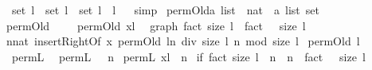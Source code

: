 \begin{isabellebody}
\ {\isachardoublequoteopen}set\ l{}\ {\isasymunion}\ set\ l{}\ {\isacharequal}\ set\ {\isacharparenleft}l{}\ {\isacharat}\ l{}{\isacharparenright}{\isachardoublequoteclose}%
\isadelimproof
\ %
\endisadelimproof
%
\isatagproof
{}\isamarkupfalse%
\ simp%
\endisatagproof
{\isafoldproof}%
%
\isadelimproof
%
\endisadelimproof
\isanewline
\isanewline
{}\isamarkupfalse%
\ permOld{\isacharcolon}{\isacharcolon}{\isachardoublequoteopen}{\isacharprime}a\ list\ {\isacharequal}{\isachargreater}\ {\isacharparenleft}nat\ {\isasymtimes}\ {\isacharparenleft}{\isacharprime}a\ list{\isacharparenright}{\isacharparenright}\ set{\isachardoublequoteclose}\ \ \isanewline
{\isachardoublequoteopen}permOld\ {\isacharbrackleft}{\isacharbrackright}\ {\isacharequal}\ {\isacharbraceleft}{\isacharbraceright}{\isachardoublequoteclose}\ {\isacharbar}\ {\isachardoublequoteopen}permOld\ {\isacharparenleft}x{\isacharhash}l{\isacharparenright}\ {\isacharequal}\ \isanewline
graph\ {\isacharbraceleft}fact\ {\isacharparenleft}size\ l{\isacharparenright}\ {\isachardot}{\isachardot}{\isacharless}\ {}{\isacharplus}fact\ {\isacharparenleft}{}\ {\isacharplus}\ {\isacharparenleft}size\ l{\isacharparenright}{\isacharparenright}{\isacharbraceright}\isanewline
{\isacharparenleft}{\isacharpercent}n{\isacharcolon}{\isacharcolon}nat{\isachardot}\ insertRightOf\ x\ {\isacharparenleft}permOld\ l{\isacharcomma}{\isacharcomma}{\isacharparenleft}n\ div\ size\ l{\isacharparenright}{\isacharparenright}\ {\isacharparenleft}n\ mod\ {\isacharparenleft}size\ l{\isacharparenright}{\isacharparenright}{\isacharparenright}\isanewline
{\isacharplus}{\isacharasterisk}\ {\isacharparenleft}permOld\ l{\isacharparenright}{\isachardoublequoteclose}\isanewline
\isanewline
{}\isamarkupfalse%
\ permL\ \ \isanewline
{\isachardoublequoteopen}permL\ {\isacharbrackleft}{\isacharbrackright}\ {\isacharequal}\ {\isacharparenleft}{\isacharpercent}n{\isachardot}\ {\isacharbrackleft}{\isacharbrackright}{\isacharparenright}{\isachardoublequoteclose}{\isacharbar}\isanewline
{\isachardoublequoteopen}permL\ {\isacharparenleft}x{\isacharhash}l{\isacharparenright}\ {\isacharequal}\ {\isacharparenleft}{\isacharpercent}n{\isachardot}\ \isanewline
if\ {\isacharparenleft}fact\ {\isacharparenleft}size\ l{\isacharparenright}\ {\isacharless}\ n\ {\isacharampersand}\ n\ {\isacharless}{\isacharequal}\ fact\ {\isacharparenleft}{}\ {\isacharplus}\ {\isacharparenleft}size\ l{\isacharparenright}{\isacharparenright}{\isacharparenright}\isanewline

\end{isabellebody}
